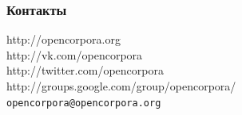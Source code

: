 \documentclass{beamer}
\begin{document}
\begin{frame}
\frametitle{Контакты}
\begin{center}
\LARGE http://opencorpora.org\\[\bigskipamount]
\Large http://vk.com/opencorpora\\
\Large http://twitter.com/opencorpora\\
\Large http://groups.google.com/group/opencorpora/\\[\bigskipamount]
\Large\texttt{opencorpora@opencorpora.org}
\end{center}
\end{frame}
\end{document}
